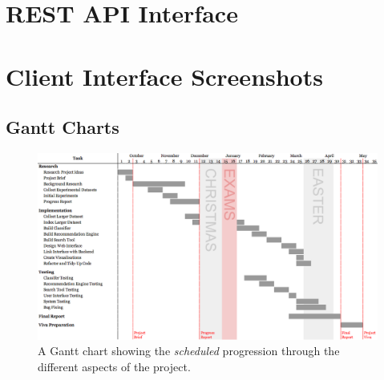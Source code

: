 \documentclass[11pt,a4paper]{report}
\begin{document}
\begin{subappendices}
\section{REST API Interface}
\label{appendix:restapi}
\pagebreak

\section{Client Interface Screenshots}
\label{appendix:screenshots}
\pagebreak

\begin{landscape}
    \section{Gantt Charts}
    \label{appendix:gantt}
    \begin{figure}[H]
        \centering
        \includegraphics[height=0.86\textwidth]{gantt.png}
        \caption*{A Gantt chart showing the \emph{scheduled} progression through the different aspects of the project.}
    \end{figure}


\end{landscape}
\end{subappendices}
\end{document}

